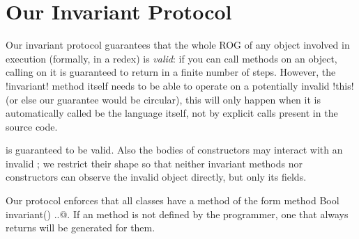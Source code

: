 \saveSpace
\section{Our Invariant Protocol}
\label{s:protocol}
\saveSpace
{}

Our invariant protocol guarantees that the whole ROG of any object involved in execution (formally, in a redex) is \emph{valid}: if you can call methods on an object, calling \Q@invariant@ on it is guaranteed to return \Q@true@ in a finite number of steps. However, the \Q!invariant! method itself needs to be able to operate on a potentially invalid \Q!this! (or else our guarantee would be circular), this will only happen when it is automatically called be the language itself, not by explicit calls present in the source code.



\Q@this@ is guaranteed to be valid.
Also the bodies of constructors may interact with an invalid \Q@this@; we restrict their shape so that neither invariant methods nor constructors can observe the invalid object directly, but only its fields.



Our protocol enforces that all classes have a method of the form \Q@read method Bool invariant() {..}@. If an \Q@invariant@ method is not defined by the programmer, one that always returns \Q@true@ will be generated for them.

